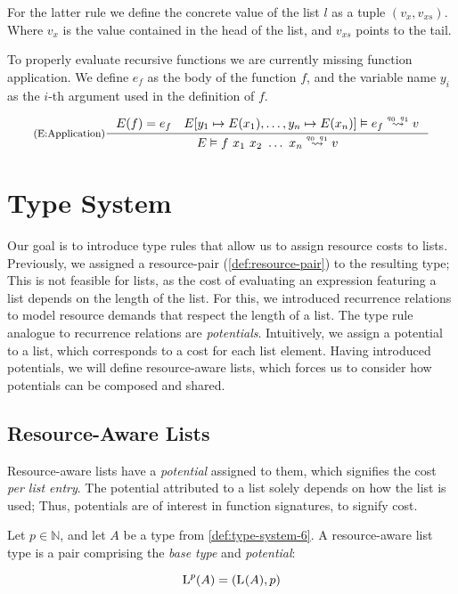 For the latter rule we define the concrete value of the list \(l\) as a tuple \((v_x, v_{xs})\). Where \(v_x\) is the value contained in the head of the list, and \(v_{xs}\) points to the tail. 

To properly evaluate recursive functions we are currently missing function application. We define \(e_f\) as the body of the function \(f\), and the variable name \(y_i\) as the \(i\)-th argument used in the definition of \(f\). 

\[
   \inference[(E:Application)]
   {E(f) = e_f 
   \quad 
   \evals{E[y_1 \mapsto E(x_1), \dots, y_n \mapsto E(x_n)]}{e_f}{v}{q_0}{q_1}}
   {\evals{E}{f~x_1~x_2~\dots~x_n}{v}{q_0}{q_1}}
\]

\section{Type System}

Our goal is to introduce type rules that allow us to assign resource costs to lists. Previously, we assigned a resource-pair (\cref{def:resource-pair}) to the resulting type; This is not feasible for lists, as the cost of evaluating an expression featuring a list depends on the length of the list. For this, we introduced recurrence relations to model resource demands that respect the length of a list. The type rule analogue to recurrence relations are \emph{potentials}. Intuitively, we assign a potential to a list, which corresponds to a cost for each list element. Having introduced potentials, we will define resource-aware lists, which forces us to consider how potentials can be composed and shared.

\subsection{Resource-Aware Lists}\label{sec:resource-aware-lists}

Resource-aware lists have a \emph{potential} assigned to them, which signifies the cost \emph{per list entry}. The potential attributed to a list solely depends on how the list is used; Thus, potentials are of interest in function signatures, to signify cost. 

\begin{definition}\label{def:ra-list}
   Let \(p \in \mathbb{N}\), and let \(A\) be a type from \cref{def:type-system-6}. A resource-aware list type is a pair comprising the \emph{base type} and \emph{potential}:

   \[
      \text{L}^{p}(A) = (\text{L}^{}(A), p)
   \]
\end{definition}


